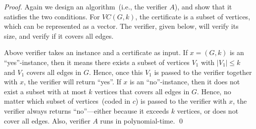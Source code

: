 \emph{Proof.} Again we design an algorithm~(i.e., the verifier $A$), and show that it satisfies the two
conditions. For $VC(G, k)$, the certificate is a subset of vertices, which
can be represented as a vector.
The verifier, given below, will verify its size, and verify if it covers all edges.

\begin{minipage}{0.8\textwidth}
	\xxx
	\xxx
	\xxx
	\xxx
	\xxx
\end{minipage}

Above verifier takes an instance and a certificate as input.
If $x = (G, k)$ is an ``yes''-instance, then it means there exists a subset of vertices $V_1$
with $|V_1| \le k$ and $V_1$ covers all edges in $G$.
Hence, once this $V_1$ is passed to the verifier together with $x$,
the verifier will return ``yes''.
If $x$ is an ``no''-instance, then it does not exist a subset with at most $k$ vertices
that covers all edges in $G$.
Hence, no matter which subset of vertices~(coded in $c$) is passed to the verifier with $x$,
the verifier always returns ``no''---either because it exceeds $k$ vertices,
or does not cover all edges.  Also, verifier $A$ runs in polynomial-time.
\qed

